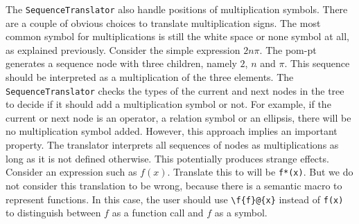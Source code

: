 The \verb|SequenceTranslator| also handle positions of multiplication symbols. There are a couple of obvious choices to translate multiplication signs. The most common symbol for multiplications is still the white space or none symbol at all, as explained previously. Consider the simple expression $2n\pi$. The \gls*{pom-pt} generates a sequence node with three children, namely $2$, $n$ and $\pi$. This sequence should be interpreted as a multiplication of the three elements. The \verb|SequenceTranslator| checks the types of the current and next nodes in the tree to decide if it should add a multiplication symbol or not. For example, if the current or next node is an operator, a relation symbol or an ellipsis, there will be no multiplication symbol added. However, this approach implies an important property. The translator interprets all sequences of nodes as multiplications as long as it is not defined otherwise. This potentially produces strange effects. Consider an expression such as $f(x)$. Translate this to \Maple{} will be \verb|f*(x)|. But we do not consider this translation to be wrong, because there is a semantic macro to represent functions. In this case, the user should use \verb|\f{f}@{x}| instead of \verb|f(x)| to distinguish between $f$ as a function call and $f$ as a symbol.

